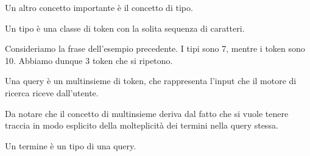 Un altro concetto importante è il concetto di tipo.
\begin{definizione}[tipo]\label{def:tipo}
	Un tipo è una classe di token con la solita sequenza di caratteri.
\end{definizione}
\begin{esempio}
	Consideriamo la frase dell'esempio precedente. I tipi sono 7, mentre i token sono 10. Abbiamo dunque
	3 token che si ripetono.
\end{esempio}
\begin{definizione}[query]\label{def:query}
	Una query è un multinsieme di token, che rappresenta l'input che il motore di ricerca
	riceve dall'utente. 
\end{definizione}
Da notare che il concetto di multinsieme deriva dal fatto che si vuole tenere traccia in modo esplicito 
della molteplicità
dei termini nella query stessa.

\begin{definizione}[termine]\label{def:temine}
	Un termine è un tipo di una query.
\end{definizione}



